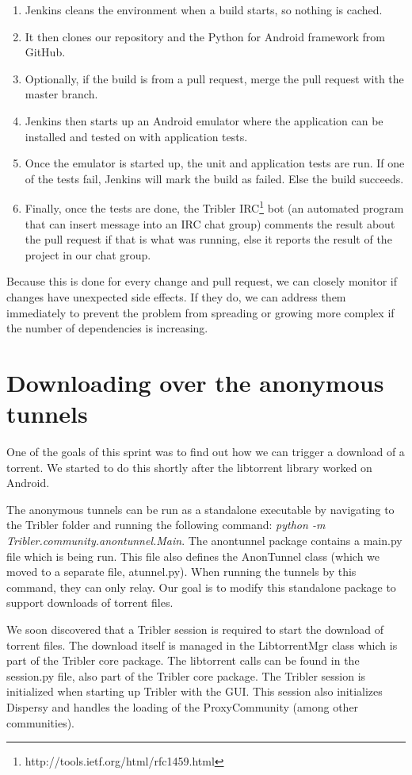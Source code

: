 		\begin{enumerate}
			\item Jenkins cleans the environment when a build starts, so nothing is cached.
			\item It then clones our repository and the Python for Android framework from GitHub.
			\item Optionally, if the build is from a pull request, merge the pull request with the master branch.
			\item Jenkins then starts up an Android emulator where the application can be installed and tested on with application tests.
			\item Once the emulator is started up, the unit and application tests are run. If one of the tests fail, Jenkins will mark the build as failed. Else the build succeeds.
			\item Finally, once the tests are done, the Tribler IRC\footnote{http://tools.ietf.org/html/rfc1459.html} bot (an automated program that can insert message into an IRC chat group) comments the result about the pull request if that is what was running, else it reports the result of the project in our chat group.
		\end{enumerate} 
		
		Because this is done for every change and pull request, we can closely monitor if changes have unexpected side effects. If they do, we can address them immediately to prevent the problem from spreading or growing more complex if the number of dependencies is increasing.
		
	\section{Downloading over the anonymous tunnels}
	One of the goals of this sprint was to find out how we can trigger a download of a torrent. We started to do this shortly after the libtorrent library worked on Android.
	
	The anonymous tunnels can be run as a standalone executable by navigating to the Tribler folder and running the following command: \emph{python -m Tribler.community.anontunnel.Main}. The anontunnel package contains a main.py file which is being run. This file also defines the AnonTunnel class (which we moved to a separate file, atunnel.py). When running the tunnels by this command, they can only relay. Our goal is to modify this standalone package to support downloads of torrent files.
	
	We soon discovered that a Tribler session is required to start the download of torrent files. The download itself is managed in the LibtorrentMgr class which is part of the Tribler core package. The libtorrent calls can be found in the session.py file, also part of the Tribler core package. The Tribler session is initialized when starting up Tribler with the GUI. This session also initializes Dispersy and handles the loading of the ProxyCommunity (among other communities).
	
